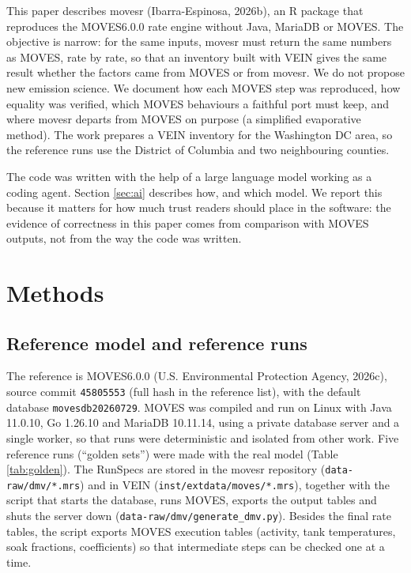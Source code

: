 \documentclass[preprint,
3p]{elsarticle} %
\begin{document}
This paper describes movesr (Ibarra-Espinosa, 2026b), an R package that
reproduces the MOVES6.0.0 rate engine without Java, MariaDB or MOVES.
The objective is narrow: for the same inputs, movesr must return the
same numbers as MOVES, rate by rate, so that an inventory built with
VEIN gives the same result whether the factors came from MOVES or from
movesr. We do not propose new emission science. We document how each
MOVES step was reproduced, how equality was verified, which MOVES
behaviours a faithful port must keep, and where movesr departs from
MOVES on purpose (a simplified evaporative method). The work prepares a
VEIN inventory for the Washington DC area, so the reference runs use the
District of Columbia and two neighbouring counties.

The code was written with the help of a large language model working as
a coding agent. Section \ref{sec:ai} describes how, and which model. We
report this because it matters for how much trust readers should place
in the software: the evidence of correctness in this paper comes from
comparison with MOVES outputs, not from the way the code was written.

\section{Methods}\label{methods}

\subsection{\texorpdfstring{Reference model and reference runs
\label{sec:runs}}{Reference model and reference runs }}\label{reference-model-and-reference-runs}

The reference is MOVES6.0.0 (U.S. Environmental Protection Agency,
2026c), source commit \texttt{45805553} (full hash in the reference
list), with the default database \texttt{movesdb20260729}. MOVES was
compiled and run on Linux with Java 11.0.10, Go 1.26.10 and MariaDB
10.11.14, using a private database server and a single worker, so that
runs were deterministic and isolated from other work. Five reference
runs (``golden sets'') were made with the real model (Table
\ref{tab:golden}). The RunSpecs are stored in the movesr repository
(\texttt{data-raw/dmv/*.mrs}) and in VEIN
(\texttt{inst/extdata/moves/*.mrs}), together with the script that
starts the database, runs MOVES, exports the output tables and shuts the
server down (\texttt{data-raw/dmv/generate\_dmv.py}). Besides the final
rate tables, the script exports MOVES execution tables (activity, tank
temperatures, soak fractions, coefficients) so that intermediate steps
can be checked one at a time.
\end{document}
